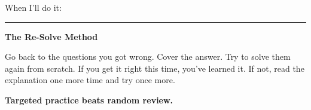 {\begin{tcolorbox}[
    enhanced,
    colback=funRedLight,
    colframe=funRed!40,
    arc=10pt,
    boxrule=1.5pt,
    left=6mm, right=6mm, top=5mm, bottom=5mm,
]
\vspace{1mm}

\hspace{5mm}\textcolor{funRed}{\faArrowRight}\hspace{2mm}When I'll do it: \rule[-2pt]{5cm}{0.5pt}
\end{tcolorbox}

\vspace{3mm}

\begin{tcolorbox}[
    enhanced,
    colback=funYellowLight,
    colframe=funYellow!60,
    arc=10pt,
    boxrule=1pt,
    left=6mm, right=6mm, top=4mm, bottom=4mm,
]
{\bfseries\color{funYellowDark} \faLightbulb\hspace{2mm}The Re-Solve Method}

\vspace{2mm}

Go back to the questions you got wrong. Cover the answer. Try to solve them again from scratch. If you get it right this time, you've learned it. If not, read the explanation one more time and try once more.
\end{tcolorbox}

\vspace{4mm}

\begin{center}
{\large\bfseries\color{funRedDark} \faCrosshairs\hspace{2mm}Targeted practice beats random review.\hspace{2mm}\faCrosshairs}
\end{center}

}
\newpage

